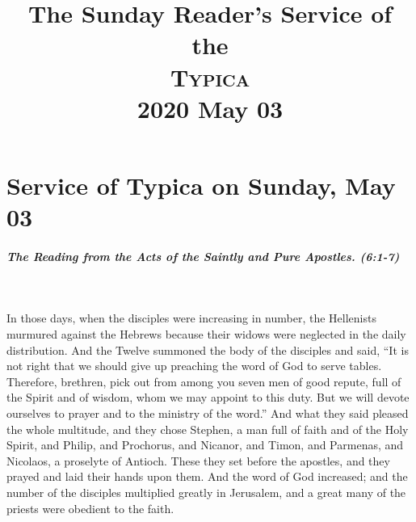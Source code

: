 \documentclass[twoside, letterpaper, 12pt]{report}
\title{The Sunday Reader's Service of the \\ \textsc{Typica} \\ 2020 May 03}
\date{}
\author{}
\begin{document}
\maketitle
\pagestyle{empty} %
\cleardoublepage
\pagestyle{plain}
\setcounter{page}{1} %
\chapter*{Service of Typica on Sunday, May 03}

\readerline{\throughtheprayers{}}

\trisagionNeedsAmen[reader][prepentecost]








\paragraph{The Reading from the Acts of the Saintly and Pure Apostles. (6:1-7)}\mbox{}\\

\begin{maybetwocolumns}
In those days, when the disciples were increasing in number, the Hellenists murmured
against the Hebrews because their widows were neglected in the daily distribution. And the Twelve
summoned the body of the disciples and said, “It is not right that we should give up preaching the
word of God to serve tables. Therefore, brethren, pick out from among you seven men of good
repute, full of the Spirit and of wisdom, whom we may appoint to this duty. But we will devote
ourselves to prayer and to the ministry of the word.” And what they said pleased the whole
multitude, and they chose Stephen, a man full of faith and of the Holy Spirit, and Philip, and
Prochorus, and Nicanor, and Timon, and Parmenas, and Nicolaos, a proselyte of Antioch. These
they set before the apostles, and they prayed and laid their hands upon them. And the word of God
increased; and the number of the disciples multiplied greatly in Jerusalem, and a great many of the
priests were obedient to the faith.
\end{maybetwocolumns}
\end{document}
